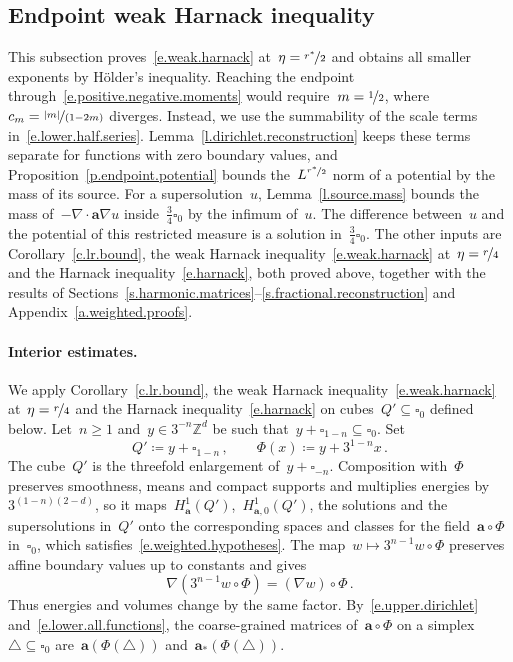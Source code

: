 \documentclass[11pt,letterpaper]{article}
\numberwithin{equation}{section}
\theoremstyle{definition}
\newcommand{\Zd}{\mathbb{Z}^d}
\renewcommand{\a}{\mathbf{a}}
\newcommand{\nf}{\nicefrac}
\newcommand{\cu}{\square}
\newcommand{\Hzero}[1]{H^1_{#1,0}}
\begin{document}
\subsection{Endpoint weak Harnack inequality}
\label{ss.harnack.endpoint}


This subsection proves~\eqref{e.weak.harnack} at~$\eta=\nf{r^*}2$ and obtains all smaller exponents by H\"older's inequality. Reaching the endpoint through~\eqref{e.positive.negative.moments} would require~$m=\nf12$, where~$c_m=\nf{|m|}{(1-2m)}$ diverges. Instead, we use the summability of the scale terms in~\eqref{e.lower.half.series}. Lemma~\ref{l.dirichlet.reconstruction} keeps these terms separate for functions with zero boundary values, and Proposition~\ref{p.endpoint.potential} bounds the~$L^{\nf{r^*}2}$ norm of a potential by the mass of its source. For a supersolution~$u$, Lemma~\ref{l.source.mass} bounds the mass of~$-\nabla\cdot\a\nabla u$ inside~$\frac34\cu_0$ by the infimum of~$u$. The difference between~$u$ and the potential of this restricted measure is a solution in~$\frac34\cu_0$. The other inputs are Corollary~\ref{c.lr.bound}, the weak Harnack inequality~\eqref{e.weak.harnack} at~$\eta=\nf r4$ and the Harnack inequality~\eqref{e.harnack}, both proved above, together with the results of Sections~\ref{s.harmonic.matrices}--\ref{s.fractional.reconstruction} and Appendix~\ref{a.weighted.proofs}.

\paragraph{Interior estimates.} We apply Corollary~\ref{c.lr.bound}, the weak Harnack inequality~\eqref{e.weak.harnack} at~$\eta=\nf r4$ and the Harnack inequality~\eqref{e.harnack} on cubes~$Q'\subseteq\cu_0$ defined below. Let~$n\geq1$ and~$y\in3^{-n}\Zd$ be such that~$y+\cu_{1-n}\subseteq\cu_0$. Set
\begin{equation*}
	Q'\coloneqq y+\cu_{1-n}\,,\qquad\Phi(x)\coloneqq y+3^{1-n}x\,.
\end{equation*}
The cube~$Q'$ is the threefold enlargement of~$y+\cu_{-n}$. Composition with~$\Phi$ preserves smoothness, means and compact supports and multiplies energies by~$3^{(1-n)(2-d)}$, so it maps~$H^1_\a(Q')$,~$\Hzero{\a}(Q')$, the solutions and the supersolutions in~$Q'$ onto the corresponding spaces and classes for the field~$\a\circ\Phi$ in~$\cu_0$, which satisfies~\eqref{e.weighted.hypotheses}. The map~$w\mapsto3^{n-1}w\circ\Phi$ preserves affine boundary values up to constants and gives
\begin{equation*}
	\nabla(3^{n-1}w\circ\Phi)=(\nabla w)\circ\Phi\,.
\end{equation*}
Thus energies and volumes change by the same factor. By~\eqref{e.upper.dirichlet} and~\eqref{e.lower.all.functions}, the coarse-grained matrices of~$\a\circ\Phi$ on a simplex~$\triangle\subseteq\cu_0$ are~$\a(\Phi(\triangle))$ and~$\a_*(\Phi(\triangle))$.
\end{document}
